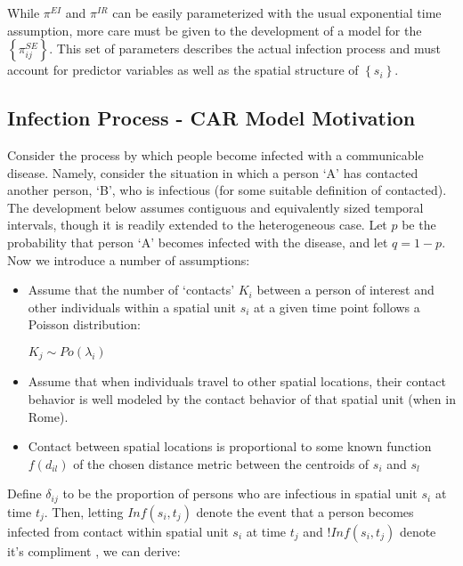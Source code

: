 \documentclass[12pt]{article}
\begin{document}
        While $\pi^{EI}$ and $\pi^{IR}$ can be easily parameterized with the usual exponential time assumption, more care must be given to the development 
        of a model for the $\left\{\pi^{SE}_{ij} \right\}$. This set of parameters 
        describes the actual infection process and must account for predictor variables as well as the 
        spatial structure of $\left\{ s_i \right\}$. 

\subsection{Infection Process - CAR Model Motivation}

Consider the process by which people become infected with a communicable disease. 
Namely, consider the situation in which a person `A' has contacted another person, `B', 
who is infectious (for some suitable definition of contacted). The development below assumes contiguous and equivalently sized temporal intervals, 
though it is readily extended to the heterogeneous case. 
Let $p$ be the probability that person `A' becomes infected with the disease, and
let $q=1-p$. Now we introduce a number of assumptions:

\begin{itemize}

    \item Assume that the number of `contacts' $K_i$ between a person of interest 
    and other individuals within a spatial unit $s_i$ at a given time point follows a Poisson 
    distribution:\\
    \begin{center}
        $K_j \sim Po(\lambda_i)$
    \end{center}
    \item Assume that when individuals travel to other spatial locations, their 
        contact behavior is well modeled by the contact behavior of that spatial unit (when in Rome).  
    \item Contact between spatial locations is proportional to some known function $f(d_{il})$
        of the chosen distance metric between the centroids of $s_i$ and $s_l$
\end{itemize}

Define $\delta_{ij}$ to be the proportion of persons who are infectious in spatial unit $s_i$ 
at time $t_j$. Then, letting $Inf(s_i, t_j)$ denote the event that a person becomes 
infected from contact within spatial unit $s_i$ at time $t_j$ and $!Inf(s_i, t_j)$ denote it's compliment
, we can derive:
\end{document}
